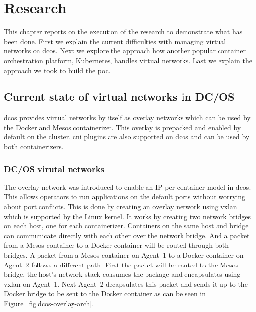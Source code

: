 \chapter{Research}
This chapter reports on the execution of the research to demonstrate what has been done. First we explain the current difficulties with managing virtual networks on \gls{dcos}. Next we explore the approach how another popular container orchestration platform, Kubernetes, handles virtual networks. Last we explain the approach we took to build the \gls{poc}.

\section{Current state of virtual networks in DC/OS}
\Gls{dcos} provides virtual networks by itself as overlay networks which can be used by the Docker and Mesos containerizer. This overlay is prepacked and enabled by default on the cluster. \Gls{cni} plugins are also supported on \gls{dcos} and can be used by both containerizers.

\subsection{DC/OS virutal networks}
The overlay network was introduced to enable an IP-per-container model in \gls{dcos}. This allows operators to run applications on the default ports without worrying about port conflicts. This is done by creating an overlay network using \gls{vxlan}\cite{mahalingam2014virtual} which is supported by the Linux kernel. It works by creating two network bridges on each host, one for each containerizer. Containers on the same host and bridge can communicate directly with each other over the network bridge. And a packet from a Mesos container to a Docker container will be routed through both bridges. A packet from a Mesos container on Agent~1 to a Docker container on Agent~2 follows a different path. First the packet will be routed to the Mesos bridge, the host's network stack consumes the package and encapsulates using \gls{vxlan} on Agent~1. Next Agent~2 decapsulates this packet and sends it up to the Docker bridge to be sent to the Docker container as can be seen in Figure~\ref{fig:dcos-overlay-arch}.

